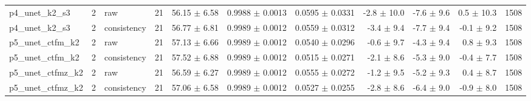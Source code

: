 \begin{tabular}{lllrrrrrrrr}
p4\_unet\_k2\_s3 & 2 & raw & 21 & 56.15 $\pm$ 6.58 & 0.9988 $\pm$ 0.0013 & 0.0595 $\pm$ 0.0331 & -2.8 $\pm$ 10.0 & -7.6 $\pm$ 9.6 & 0.5 $\pm$ 10.3 & 1508 \\
p4\_unet\_k2\_s3 & 2 & consistency & 21 & 56.77 $\pm$ 6.81 & 0.9989 $\pm$ 0.0012 & 0.0559 $\pm$ 0.0312 & -3.4 $\pm$ 9.4 & -7.7 $\pm$ 9.4 & -0.1 $\pm$ 9.2 & 1508 \\
p5\_unet\_ctfm\_k2 & 2 & raw & 21 & 57.13 $\pm$ 6.66 & 0.9989 $\pm$ 0.0012 & 0.0540 $\pm$ 0.0296 & -0.6 $\pm$ 9.7 & -4.3 $\pm$ 9.4 & 0.8 $\pm$ 9.3 & 1508 \\
p5\_unet\_ctfm\_k2 & 2 & consistency & 21 & 57.52 $\pm$ 6.88 & 0.9989 $\pm$ 0.0012 & 0.0515 $\pm$ 0.0271 & -2.1 $\pm$ 8.6 & -5.3 $\pm$ 9.0 & -0.4 $\pm$ 7.7 & 1508 \\
p5\_unet\_ctfmz\_k2 & 2 & raw & 21 & 56.59 $\pm$ 6.27 & 0.9989 $\pm$ 0.0012 & 0.0555 $\pm$ 0.0272 & -1.2 $\pm$ 9.5 & -5.2 $\pm$ 9.3 & 0.4 $\pm$ 8.7 & 1508 \\
p5\_unet\_ctfmz\_k2 & 2 & consistency & 21 & 57.06 $\pm$ 6.58 & 0.9989 $\pm$ 0.0012 & 0.0527 $\pm$ 0.0255 & -2.8 $\pm$ 8.6 & -6.4 $\pm$ 9.0 & -0.9 $\pm$ 8.0 & 1508 \\
\bottomrule
\end{tabular}
